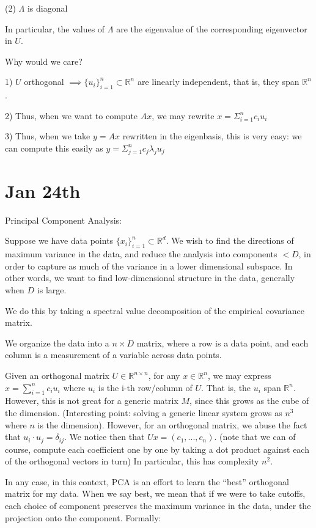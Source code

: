 \documentclass[10pt]{article}
\begin{document}
(2) $\Lambda$ is diagonal

In particular, the values of $\Lambda$ are the eigenvalue of the corresponding eigenvector in $U$.

Why would we care?

1) $U$ orthogonal $\implies \{ u_i \}_{i=1}^n \subset \mathbb{R}^n$ are linearly independent, that is, they span $\mathbb{R}^n$.

2) Thus, when we want to compute $Ax$, we may rewrite $x = \Sigma_{i=1}^n c_i u_i$

3) Thus, when we take $y = Ax$ rewritten in the eigenbasis, this is very easy: we can compute this easily as $y = \Sigma_{j=1}^n c_j \lambda_j u_j$

\section*{Jan 24th}

Principal Component Analysis:

Suppose we have data points $\{ x_i \}_{i=1}^n \subset \mathbb{R}^d$. We wish to find the directions of maximum variance in the data, and reduce the analysis into components $< D$, in order to capture as much of the variance in a lower dimensional subspace. In other words, we want to find low-dimensional structure in the data, generally when $D$ is large.

We do this by taking a spectral value decomposition of the empirical covariance matrix. 

We organize the data into a $n \times D$ matrix, where a row is a data point, and each column is a measurement of a variable across data points.

Given an orthogonal matrix $U \in \mathbb{R}^{n \times n}$, for any $x \in \mathbb{R}^n$, we may express $x = \sum_{i=1}^n c_i u_i$ where $u_i$ is the i-th row/column of $U$. That is, the $u_i$ span $\mathbb{R}^n$. However, this is not great for a generic matrix $M$, since this grows as the cube of the dimension. (Interesting point: solving a generic linear system grows as $n^3$ where $n$ is the dimension). However, for an orthogonal matrix, we abuse the fact that $u_i \cdot u_j = \delta_{ij}$. We notice then that $Ux = (c_1,...,c_n)$. (note that we can of course, compute each coefficient one by one by taking a dot product against each of the orthogonal vectors in turn) In particular, this has complexity $n^2$.

In any case, in this context, PCA is an effort to learn the “best” orthogonal matrix for my data. When we say best, we mean that if we were to take cutoffs, each choice of component preserves the maximum variance in the data, under the projection onto the component. Formally:
\end{document}

